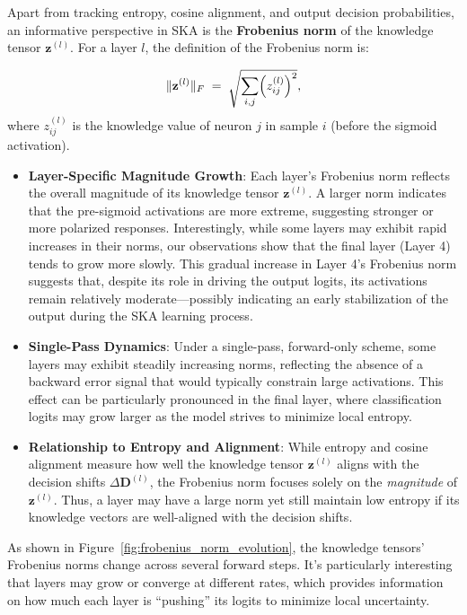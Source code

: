 \documentclass{article}
\begin{document}
Apart from tracking entropy, cosine alignment, and output decision probabilities, an informative perspective in SKA is the \textbf{Frobenius norm} of the knowledge tensor \(\mathbf{z}^{(l)}\). For a layer \(l\), the definition of the Frobenius norm is:

\[
\|\mathbf{z}^{(l)}\|_F \;=\; \sqrt{\sum_{i,j} \Bigl(z_{ij}^{(l)}\Bigr)^2},
\]
where \(z_{ij}^{(l)}\) is the knowledge value of neuron \(j\) in sample \(i\) (before the sigmoid activation).

\begin{itemize}
	\item \textbf{Layer-Specific Magnitude Growth}:  
	Each layer’s Frobenius norm reflects the overall magnitude of its knowledge tensor \(\mathbf{z}^{(l)}\). A larger norm indicates that the pre-sigmoid activations are more extreme, suggesting stronger or more polarized responses. Interestingly, while some layers may exhibit rapid increases in their norms, our observations show that the final layer (Layer 4) tends to grow more slowly. This gradual increase in Layer 4’s Frobenius norm suggests that, despite its role in driving the output logits, its activations remain relatively moderate—possibly indicating an early stabilization of the output during the SKA learning process.
	
	\item \textbf{Single-Pass Dynamics}:  
	Under a single-pass, forward-only scheme, some layers may exhibit steadily increasing norms, reflecting the absence of a backward error signal that would typically constrain large activations. This effect can be particularly pronounced in the final layer, where classification logits may grow larger as the model strives to minimize local entropy.
	
	\item \textbf{Relationship to Entropy and Alignment}:  
	While entropy and cosine alignment measure how well the knowledge tensor \(\mathbf{z}^{(l)}\) aligns with the decision shifts \(\Delta \mathbf{D}^{(l)}\), the Frobenius norm focuses solely on the \emph{magnitude} of \(\mathbf{z}^{(l)}\). Thus, a layer may have a large norm yet still maintain low entropy if its knowledge vectors are well-aligned with the decision shifts.
\end{itemize}

As shown in Figure~\ref{fig:frobenius_norm_evolution}, the knowledge tensors’ Frobenius norms change across several forward steps. It’s particularly interesting that layers may grow or converge at different rates, which provides information on how much each layer is “pushing” its logits to minimize local uncertainty.
\end{document}
